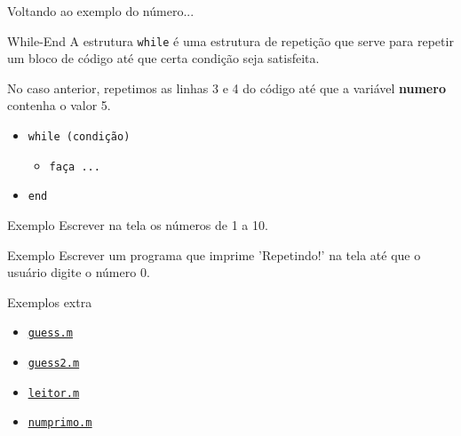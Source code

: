 \documentclass[hyperref={pdfpagelabels=false}]{beamer}
\begin{document}
\begin{frame}{Voltando ao exemplo do número...}
  
\end{frame}

\begin{frame}{While-End}
  A estrutura {\texttt{while}} é uma estrutura de \alert{repetição} que serve para repetir um bloco de código até que certa condição seja satisfeita.

  No caso anterior, repetimos as linhas 3 e 4 do código até que a variável \textbf{numero} contenha o valor 5.

  \begin{itemize}
  \item[] {\texttt{while (condição)}}
    \begin{itemize}
    \item[] {\texttt{faça ...}}
    \end{itemize}
  \item[] {\texttt{end}}
  \end{itemize}
\end{frame}

\begin{frame}{Exemplo}
  Escrever na tela os números de 1 a 10.
  
\end{frame}

\begin{frame}{Exemplo}
  Escrever um programa que imprime 'Repetindo!' na tela até que o usuário digite o número 0.
\end{frame}

\begin{frame}{Exemplos extra}
  \begin{itemize}
  \item \href{listings/guess.m}{\underline{\texttt{guess.m}}}
  \item \href{listings/guess2.m}{\underline{\texttt{guess2.m}}}
  \item \href{listings/leitor.m}{\underline{\texttt{leitor.m}}}
  \item \href{listings/numprimo.m}{\underline{\texttt{numprimo.m}}}
  \end{itemize}
\end{frame}
\end{document}

